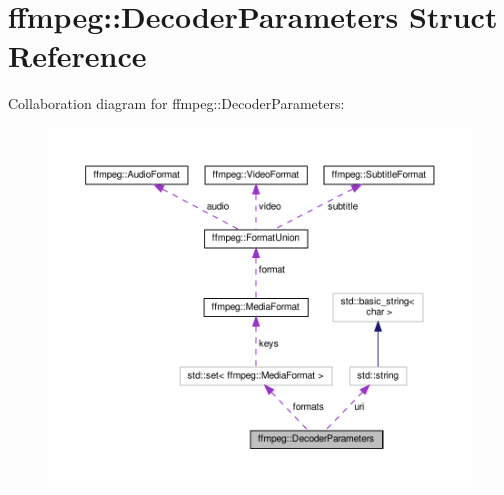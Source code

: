 \hypertarget{structffmpeg_1_1DecoderParameters}{}\section{ffmpeg\+:\+:Decoder\+Parameters Struct Reference}
\label{structffmpeg_1_1DecoderParameters}


Collaboration diagram for ffmpeg\+:\+:Decoder\+Parameters\+:
\nopagebreak
\begin{figure}[H]
\begin{center}
\leavevmode
\includegraphics[width=350pt]{structffmpeg_1_1DecoderParameters__coll__graph}
\end{center}
\end{figure}
